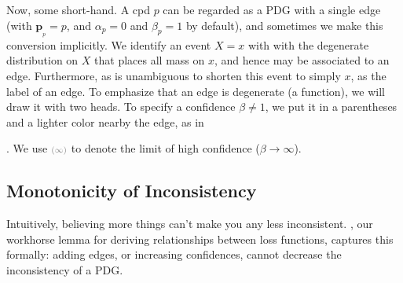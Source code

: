 \documentclass[twoside]{article}
\theoremstyle{plain}
\theoremstyle{definition}
\newcommand{\mat}[1]{\mathbf{#1}}
\newcommand{\ssub}[1]{_{\!_{#1}\!}}
\newcommand{\bp}[1][L]{\mat{p}\ssub{#1}}
\newcommand{\dg}[1]{\mathbdcal{#1}}
\begin{document}
Now, some short-hand.
A cpd $p$ can be regarded as a PDG with a single edge (with $\bp[p] = p$, and  $\alpha_p=0$ and $\beta_p = 1$ by default), and sometimes we make this conversion implicitly.
We identify an event $X=x$ with with the degenerate distribution on $X$ that places all mass on $x$, and hence may be associated to an edge.
Furthermore, as is unambiguous to shorten this event to simply $x$, as the label of an edge.
To emphasize that an edge is degenerate (a function), we will draw it with two heads. 
To specify a confidence $\beta \ne 1$, we put it in a parentheses and a lighter color nearby the edge, as in
.
%
We use ${\scriptstyle\color{gray}(\infty)}$ to denote the limit of high confidence ($\beta \to \infty$).


\subsection{Monotonicity of Inconsistency}


Intuitively, believing more things can't make you any less inconsistent.
, our workhorse lemma for deriving relationships between loss functions, captures this formally: adding edges, or increasing confidences, cannot decrease the inconsistency of a PDG.
\end{document}
